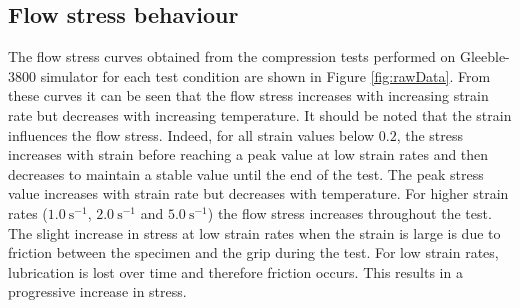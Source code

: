 \documentclass[twoside,english,1p,final,sort&compress]{elsarticle}
\theoremstyle{plain}
\begin{document}
\subsection{Flow stress behaviour}
The flow stress curves obtained from the compression tests performed on Gleeble-3800 simulator for each test condition are shown in Figure \ref{fig:rawData}. From these curves it can be seen that the flow stress increases with increasing strain rate but decreases with increasing temperature. It should be noted that the strain influences the flow stress. Indeed, for all strain values below $0.2$, the stress increases with strain before reaching a peak value at low strain rates and then decreases to maintain a stable value until the end of the test. The peak stress value increases with strain rate but decreases with temperature. For higher strain rates ($1.0\ \text{s}^{-1}$, $2.0\ \text{s}^{-1}$ and $5.0\ \text{s}^{-1}$) the flow stress increases throughout the test. The slight increase in stress at low strain rates when the strain is large is due to friction between the specimen and the grip during the test. For low strain rates, lubrication is lost over time and therefore friction occurs. This results in a progressive increase in stress.
\end{document}
